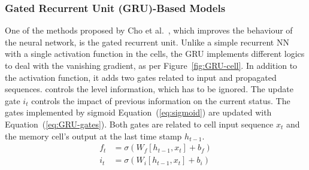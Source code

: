 %
\subsubsection{Gated Recurrent Unit (GRU)-Based Models} \label{subsub:gru}
One of the methods proposed by Cho et al.~\cite{GRU_cho_properties_2014}, which improves the behaviour of the neural network, is the gated recurrent unit.
Unlike a simple recurrent NN with a single activation function in the cells, the GRU implements different logics to deal with the vanishing gradient, as per \mbox{Figure~\ref{fig:GRU-cell}}.
In addition to the activation function, it adds two gates related to input and propagated sequences.
controls the level information, which has to be ignored.
The update gate $i_t$ controls the impact of previous information on the current status.
The gates implemented by sigmoid \mbox{Equation~(\ref{eq:sigmoid})} are updated with \mbox{Equation~(\ref{eq:GRU-gates})}.
Both gates are related to cell input sequence $x_t$ and the memory cell's output at the last time stamp $h_{t-1}$.
\begin{equation}
    \begin{split}
        f_t &= \sigma \left( W_{f} \left[ h_{t-1}, x_t \right] + b_f \right) \\
        i_t &= \sigma \left( W_{i} \left[ h_{t-1}, x_t \right] + b_i \right)
    \end{split}
    \label{eq:GRU-gates}
\end{equation}

